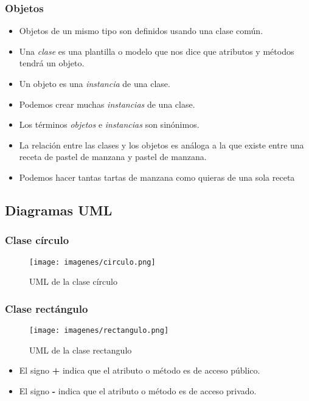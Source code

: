 \documentclass{beamer}
\begin{document}
\begin{frame}
\frametitle{Objetos}
\begin{itemize}[<+->]
\item Objetos de un mismo tipo son definidos usando una clase común.
\item Una \emph{clase} es una plantilla o modelo que nos dice que atributos y métodos tendrá un objeto.
\item Un objeto es una \emph{instancia} de una clase.
\item Podemos crear muchas \emph{instancias} de una clase.
\item Los términos \emph{objetos} e \emph{instancias} son sinónimos.
\item La relación entre las clases y los objetos es análoga a la que existe entre una receta de pastel de manzana y pastel de manzana.
\item Podemos hacer tantas tartas de manzana como quieras de una sola receta
\end{itemize}
\pause
\end{frame}


\subsection{Diagramas UML}
\begin{frame}
\frametitle{Clase círculo} 
\begin{figure}
\texttt{[image: imagenes/circulo.png]} 
\caption{UML de la clase círculo}
\end{figure} 
\end{frame}

\begin{frame}
\frametitle{Clase rectángulo} 
\begin{figure}
\texttt{[image: imagenes/rectangulo.png]} 
\caption{UML de la clase rectangulo}
\end{figure} 
\pause
\begin{itemize}
\item El signo \textbf{+} indica que el atributo o método es de acceso público.
\item El signo \textbf{-} indica que el atributo o método es de acceso privado.
\end{itemize}
\pause
\end{frame}
\end{document}
